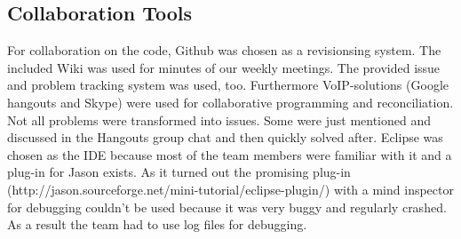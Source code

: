 \subsection{Collaboration Tools}
For collaboration on the code, Github was chosen as a revisionsing system. The included Wiki was used for minutes of our weekly meetings. The provided issue and problem tracking system was used, too. Furthermore VoIP-solutions (Google hangouts and Skype) were used for collaborative programming and reconciliation. Not all problems were transformed into issues. Some were just mentioned and discussed in the Hangouts group chat and then quickly solved after. Eclipse was chosen as the IDE because most of the team members were familiar with it and a plug-in for Jason exists. As it turned out the promising plug-in (http://jason.sourceforge.net/mini-tutorial/eclipse-plugin/) with a mind inspector for debugging couldn't be used because it was very buggy and regularly crashed. As a result the team had to use log files for debugging. 

